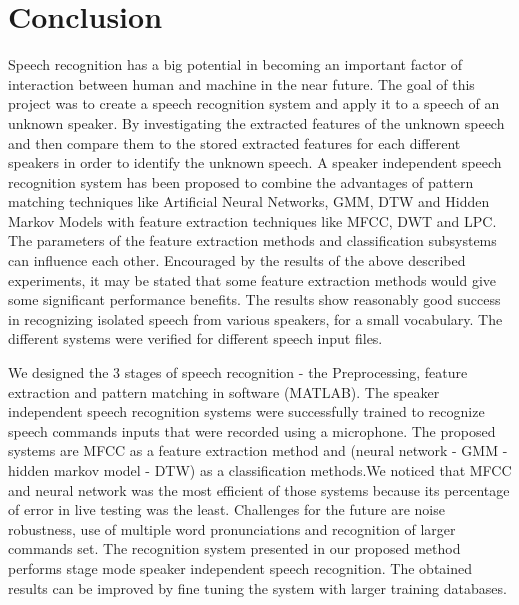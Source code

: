 \documentclass[12pt, a4paper, twoside]{report}
\begin{document}
\chapter{Conclusion}
Speech recognition has a big potential in becoming an important factor of interaction between human and machine in the near future. The goal of this project was to create a speech recognition system and apply it to a speech of an unknown speaker. By investigating the extracted features of the unknown speech and then compare them to the stored extracted features for each different speakers in order to identify the unknown speech. A speaker independent speech recognition system has been proposed to combine the advantages of pattern matching techniques like Artificial Neural Networks, GMM, DTW and Hidden Markov Models with feature extraction techniques like MFCC, DWT and LPC. The parameters of the feature extraction methods and classification subsystems can influence each other. Encouraged by the results of the above described experiments, it may be stated that some feature extraction methods would give some significant performance benefits. The results show reasonably good success in recognizing isolated speech from various speakers, for a small vocabulary. The different systems were verified for different speech input files.

We designed the 3 stages of speech recognition - the Preprocessing, feature extraction and pattern matching in software (MATLAB). The speaker independent speech recognition systems were successfully trained to recognize speech commands inputs that were recorded using a microphone. The proposed systems are MFCC as a feature extraction method and (neural network - GMM - hidden markov model - DTW) as a classification methods.We noticed that MFCC and neural network was the most efficient of those systems because its percentage of error in live testing was the least. Challenges for the future are noise robustness, use of multiple word pronunciations and recognition of larger commands set. The recognition system presented in our proposed method performs stage mode speaker independent speech recognition. The obtained results can be improved by fine tuning the system with larger training databases.
\end{document}
